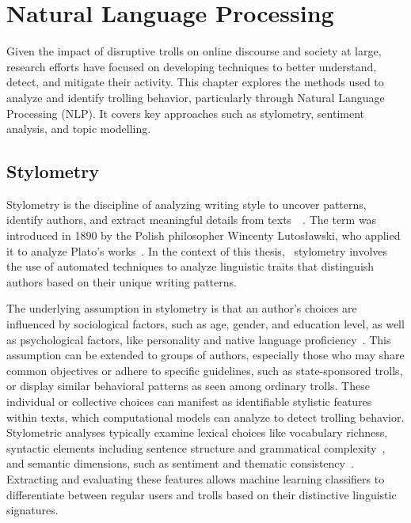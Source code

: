 \documentclass[twoside]{ctuthesis}
\theoremstyle{plain}
\theoremstyle{definition}
\theoremstyle{note}
\begin{document}
\chapter{Natural Language Processing}
Given the impact of disruptive trolls on online discourse and society at large, research efforts have focused on developing techniques to better understand, detect, and mitigate their activity. This chapter explores the methods used to analyze and identify trolling behavior, particularly through Natural Language Processing (NLP). It covers key approaches such as stylometry, sentiment analysis, and topic modelling.\par

\section{Stylometry}

Stylometry is the discipline of analyzing writing style to uncover patterns, identify authors, and extract meaningful details from texts~\cite{Mosteller1964Federalist}~\cite{Pascucci2020Misogyny}. The term was introduced in 1890 by the Polish philosopher Wincenty Lutosławski, who applied it to analyze Plato's works~\cite{Lutoslawski1898}. In the context of this thesis,  stylometry involves the use of automated techniques to analyze linguistic traits that distinguish authors based on their unique writing patterns.\par
The underlying assumption in stylometry is that an author's choices are influenced by sociological factors, such as age, gender, and education level, as well as psychological factors, like personality and native language proficiency~\cite{Daelemans2013Explanation}. This assumption can be extended to groups of authors, especially those who may share common objectives or adhere to specific guidelines, such as state-sponsored trolls, or display similar behavioral patterns as seen among ordinary trolls. These individual or collective choices can manifest as identifiable stylistic features within texts, which computational models can analyze to detect trolling behavior.
Stylometric analyses typically examine lexical choices like vocabulary richness, syntactic elements including sentence structure and grammatical complexity~\cite{Sari2018Features}, and semantic dimensions, such as sentiment and thematic consistency~\cite{PerezRosas2018Stylometry}. Extracting and evaluating these features allows machine learning classifiers to differentiate between regular users and trolls based on their distinctive linguistic signatures.\par
\end{document}
